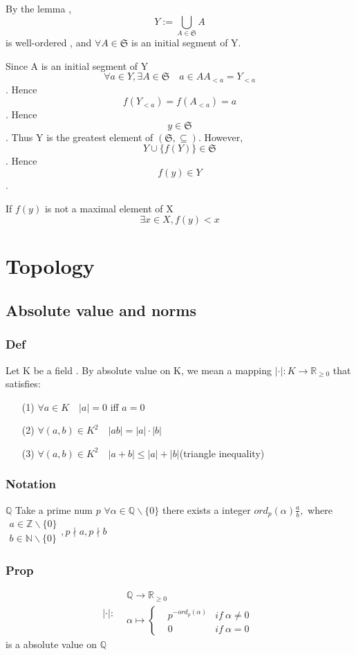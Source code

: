 \documentclass{book}
\begin{document}
By the lemma , $$Y:=\bigcup\limits_{A\in\mathfrak{S}}A$$ is well-ordered , and $\forall A\in \mathfrak{S}$ is an initial segment of Y.

Since A is an initial segment of Y$$\forall a\in Y,\exists A\in\mathfrak{S}\quad a\in AA_{<a}=Y_{<a}$$. Hence $$f(Y_{<a})=f(A_{<a})=a$$. Hence $$y\in \mathfrak{S}$$. Thus Y is the greatest element of $(\mathfrak{S},\subseteq)$.
However, $$Y\cup\{f(Y)\}\in \mathfrak{S}$$. Hence $$f(y)\in Y$$.

If $f(y)$ is not a maximal element of X $$\exists x\in X,f(y)<x$$
\part{Topology}
\chapter{Absolute value and norms}
\section{Def}
Let K be a field . By absolute value on K, we mean a mapping $\lvert \cdot\rvert:K\rightarrow\mathbb{R} _{\geq0}$ that satisfies:\begin{itemize}
    \item[(1)] $\forall a\in K\quad\lvert a\rvert=0 $ iff $a=0$
    \item[(2)] $\forall (a,b)\in K^2\quad\lvert ab\rvert=\lvert a\rvert\cdot\lvert b\rvert$
    \item[(3)] $\forall (a,b)\in K^2\quad\lvert a+b\rvert\leq\lvert a\rvert+\lvert b\rvert$(triangle inequality)
\end{itemize}
\section{Notation}
$\mathbb{Q} $
Take a prime num $p$
$\forall \alpha \in \mathbb{Q} \backslash\{0\}$ there exists a integer $ord_p(\alpha)\frac{a}{b},$ where $\begin{aligned}
    a\in \mathbb{Z} \backslash\{0\}\\
    b\in\mathbb{N} \backslash\{0\}
\end{aligned},p\nmid a,p\nmid b$
\section{Prop}
$$\lvert\cdot\rvert:\begin{aligned}
    &\mathbb{Q} \rightarrow\mathbb{R} _{\geq0}\\
    &\alpha\mapsto\left\{\begin{aligned}
        &p^{-ord_p(\alpha)}&if\ \alpha\not=0\\
        &0 &if\ \alpha=0
    \end{aligned}\right.
\end{aligned}$$ \indent is a absolute value on $\mathbb{Q} $
\end{document}
